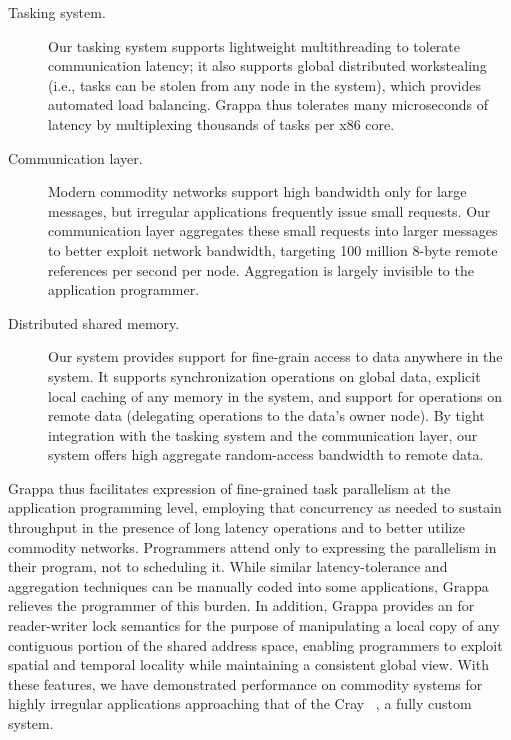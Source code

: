 \begin{description}

\item [Tasking system.] Our tasking system supports lightweight
multithreading to tolerate communication latency; it also supports global distributed
workstealing (i.e., tasks can be stolen from any node in the system), which
provides automated load balancing.  Grappa thus tolerates many
microseconds of latency by multiplexing thousands of tasks per x86 core.

\item[Communication layer.] Modern commodity networks
support high bandwidth only for large messages, but irregular applications
frequently issue small requests.   Our communication layer aggregates these small requests into larger messages to better exploit network bandwidth, targeting 100 million 8-byte remote references per second per node.  Aggregation is largely invisible to the application programmer.

\item[Distributed shared memory.] Our  system provides support for
fine-grain access to data anywhere in the system. It supports synchronization
operations on global data, explicit local caching of any memory in the system,
and support for operations on remote data (delegating operations to the data's owner node).
By tight integration with the tasking system and the
communication layer, our  system offers high aggregate random-access bandwidth to remote data.


\end{description}
Grappa thus facilitates
expression of fine-grained task parallelism at the application
programming level, employing that concurrency as needed to sustain throughput in the presence of long latency operations and to better utilize commodity networks.  Programmers attend only to expressing the parallelism in their program, not to scheduling it.  While similar latency-tolerance and aggregation techniques can be manually coded into some
applications, Grappa relieves the programmer of this burden.  In
addition, Grappa provides an  for reader-writer lock semantics for the
purpose of manipulating a local copy of any contiguous portion of the
shared address space, enabling programmers to exploit spatial and
temporal locality while maintaining a consistent global view.  With
these features, we have demonstrated performance on commodity systems
for highly irregular applications approaching that of the Cray ~\cite{feo:xmt}, a
fully custom system.

